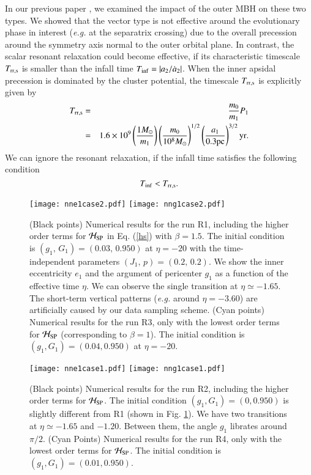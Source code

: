 \documentclass[useAMS,usenatbib,twocolumn]{mn2e}
\newcommand{\beq}{\begin{equation}}
\newcommand{\beqa}{\begin{eqnarray}}
\newcommand{\eeq}{\end{equation}}
\newcommand{\eeqa}{\end{eqnarray}}
\begin{document}
In our previous paper \citep{iwasa2016}, we examined
the impact of the outer MBH on these two types. We
showed that the vector type is not effective around the
evolutionary phase in interest ({\it e.g.}  at the separatrix
crossing) due to the overall precession around the symmetry axis normal to the outer orbital plane.
 In contrast, the scalar resonant relaxation could
become effective, if its characteristic timescale $T_{\rm rr,s}$
is smaller than the infall time $T_{\rm
inf}=|a_{2}/\dot{a}_{2}|$.
 When the inner apsidal precession is
dominated by the cluster potential, the timescale $T_{\rm rr,s}$ is explicitly given by
\beqa
T_{\rm rr,s}&=&\frac{m_{0}}{m_{1}}P_{1}\nonumber\\
&=&1.6\times10^{9}\left(\frac{1M_{\odot}}{m_1}\right)\left(\frac{m_{0}}{10^{8}M_{\odot}}\right)^{1/2}\left(\frac{a_1}{0.3
{\rm pc}}\right)^{3/2}{\rm yr}. \nonumber\\
\label{rrs}
\eeqa
We can ignore the resonant relaxation, if the infall time satisfies the following condition
\beq
T_{\rm inf}<T_{\rm rr,s}.
\eeq



\begin{figure}
\begin{center}
\texttt{[image: nne1case2.pdf]}
\texttt{[image: nng1case2.pdf]}
\caption{(Black points) Numerical results for the run R1, including the higher order terms for $\mathcal{H}_{\rm SP}$ in Eq. (\ref{hs}) with $\beta=1.5$. The initial    condition is
 $(g_{1},\, G_{1} )=(0.03,\, 0.950)$ at $\eta=-20$ with 
the time-independent parameters
$(J_1,\,p)=(0.2,\,0.2)$. We show the inner eccentricity $e_1$  and the
 argument of
pericenter $g_1$  as a function of the effective time $\eta$.
We can observe the single transition at $\eta\simeq-1.65$.
The short-term vertical patterns ({\it e.g.} around $\eta=-3.60$) are artificially caused 
by our data sampling scheme.
(Cyan points) Numerical results for the run R3, only with the lowest order terms for $\mathcal{H}_{\rm SP}$ (corresponding to $\beta=1$). The initial condition is   $(g_1,G_1)=(0.04,0.950)$ at $\eta=-20$.
}
\label{fig:evo3}
\end{center}
\end{figure}

\begin{figure}
\begin{center}
\texttt{[image: nne1case1.pdf]}
\texttt{[image: nng1case1.pdf]}
\caption{(Black points) Numerical results  for the run R2, including the higher order terms for $\mathcal{H}_{\rm SP}$.   The initial condition  $(g_1,G_1)=(0,0.950)$ is slightly different from R1 (shown in  Fig. \ref{fig:evo3}). 
We have two transitions at $\eta\simeq-1.65$ and $-1.20$.
Between them, the
angle $g_1$ librates around $\pi/2$. (Cyan Points) Numerical results for the run R4, only with the lowest order terms for $\mathcal{H}_{\rm SP}$. The initial condition is   $(g_1,G_1)=(0.01,0.950)$.}
\label{fig:evo4}
\end{center}
\end{figure}
\end{document}
